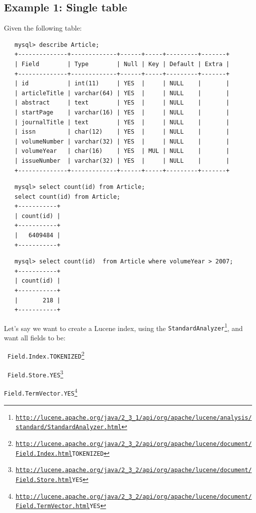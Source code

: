 \subsection{Example 1: Single table}
\label{example1}
Given the following table:
{\small
\begin{verbatim}
   mysql> describe Article;
   +--------------+-------------+------+-----+---------+-------+
   | Field        | Type        | Null | Key | Default | Extra |
   +--------------+-------------+------+-----+---------+-------+
   | id           | int(11)     | YES  |     | NULL    |       | 
   | articleTitle | varchar(64) | YES  |     | NULL    |       | 
   | abstract     | text        | YES  |     | NULL    |       | 
   | startPage    | varchar(16) | YES  |     | NULL    |       | 
   | journalTitle | text        | YES  |     | NULL    |       | 
   | issn         | char(12)    | YES  |     | NULL    |       | 
   | volumeNumber | varchar(32) | YES  |     | NULL    |       | 
   | volumeYear   | char(16)    | YES  | MUL | NULL    |       | 
   | issueNumber  | varchar(32) | YES  |     | NULL    |       | 
   +--------------+-------------+------+-----+---------+-------+
\end{verbatim}
   
\begin{verbatim}
   mysql> select count(id) from Article;
   select count(id) from Article;
   +-----------+
   | count(id) |
   +-----------+
   |   6409484 | 
   +-----------+
\end{verbatim}

\begin{verbatim}
   mysql> select count(id)  from Article where volumeYear > 2007;
   +-----------+
   | count(id) |
   +-----------+
   |       218 | 
   +-----------+
\end{verbatim}
}

Let's say we want to create a Lucene index, using the
{\tt StandardAnalyzer\footnote{
    \url{http://lucene.apache.org/java/2_3_1/api/org/apache/lucene/analysis/standard/StandardAnalyzer.html}
  }}, 
  and want all fields to be:
\begin{mlist}
\item
{\tt
        Field.Index.TOKENIZED\footnote{\url{http://lucene.apache.org/java/2_3_2/api/org/apache/lucene/document/Field.Index.html}{TOKENIZED}}
}

\item
{\tt
        Field.Store.YES\footnote{\url{http://lucene.apache.org/java/2_3_2/api/org/apache/lucene/document/Field.Store.html}{YES}}
}

\item {\tt Field.TermVector.YES\footnote{\url{http://lucene.apache.org/java/2_3_2/api/org/apache/lucene/document/Field.TermVector.html}{YES}
}
}
\end{mlist}


